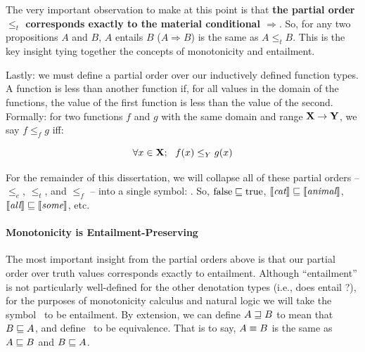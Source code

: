 The very important observation to make at this point is that
  \textbf{the partial order $\leq_t$ corresponds exactly to the material conditional $\Rightarrow$}.
So, for any two propositions $A$ and $B$, $A$ entails $B$ ($A \Rightarrow B$) is the same
  as $A \leq_t B$.
This is the key insight tying together the concepts of monotonicity and entailment.

Lastly: we must define a partial order over our inductively defined function types.
A function is less than another function if, for all
  values in the domain of the functions, the value of the first function is less than
  the value of the second.
Formally: for two functions $f$ and $g$ with the same domain and range $\mathbf{X} \rightarrow \mathbf{Y}$,
  we say $f \leq_f g$ iff:

\begin{equation}
  \forall x \in \mathbf{X}; ~~ f(x) \leq_Y g(x)
\end{equation}

For the remainder of this dissertation, we will collapse all of these partial orders
  -- $\leq_e$, $\leq_t$, and $\leq_f$ -- into
  a single symbol: \forward.
So, $\textrm{false} \sqsubseteq \textrm{true}$, $\llbracket\textit{cat}\rrbracket \sqsubseteq \llbracket\textit{animal}\rrbracket$,
  $\llbracket\textit{all}\rrbracket \sqsubseteq \llbracket\textit{some}\rrbracket$, etc.



\paragraph{Monotonicity is Entailment-Preserving}
The most important insight from the partial orders above is that our partial order
  over truth values corresponds exactly to entailment.
Although ``entailment'' is not particularly well-defined for the other denotation
  types (i.e., does  entail ?), for the purposes of monotonicity
  calculus and natural logic we will take the symbol \forward\ to be entailment.
By extension, we can define $A \sqsupseteq B$ to mean that $B \sqsubseteq A$, and define
  \equivalent\ to be equivalence.
That is to say, $A \equiv B$ is the same as $A \sqsubseteq B$ and $B \sqsubseteq A$.


